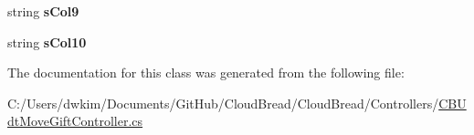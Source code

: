 \begin{DoxyCompactItemize}
\item 
string {\bfseries s\+Col9}\hypertarget{a00113_a9b31af5aa356b1fe2863d03c7771b4ee}{}\label{a00113_a9b31af5aa356b1fe2863d03c7771b4ee}

\item 
string {\bfseries s\+Col10}\hypertarget{a00113_ae52a598611f9bdb26c8992ab06e2d666}{}\label{a00113_ae52a598611f9bdb26c8992ab06e2d666}

\end{DoxyCompactItemize}


The documentation for this class was generated from the following file\+:\begin{DoxyCompactItemize}
\item 
C\+:/\+Users/dwkim/\+Documents/\+Git\+Hub/\+Cloud\+Bread/\+Cloud\+Bread/\+Controllers/\hyperlink{a00231}{C\+B\+Udt\+Move\+Gift\+Controller.\+cs}\end{DoxyCompactItemize}
